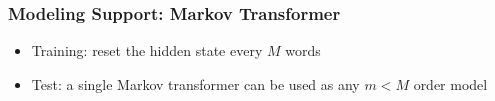 \documentclass{beamer}
\begin{document}
\begin{frame}
\frametitle{Modeling Support: Markov Transformer}
\begin{center}
\end{center}
\begin{itemize}
    \item<3-> Training: reset the hidden state every $M$ words
    \item<5-> Test: a single Markov transformer can be used as any $m<M$ order model
\end{itemize}

\begin{columns}
\begin{column}{0.68\textwidth}
\centering
{}
\end{column}
\begin{column}{0.27\textwidth}
\centering

\end{column}
\end{columns}
\end{frame}
\end{document}
